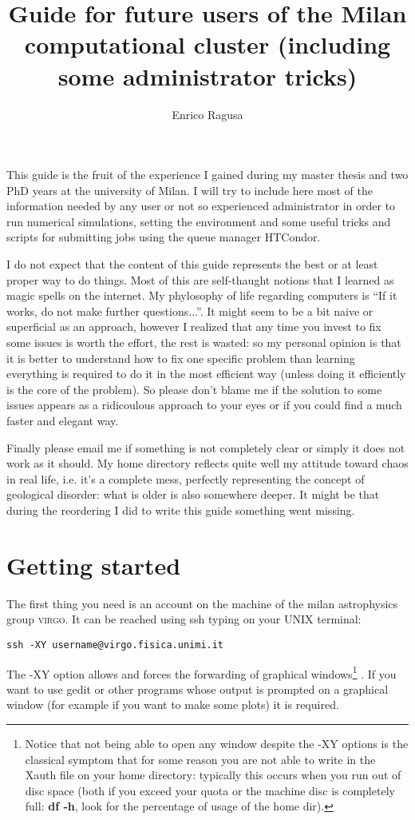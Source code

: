 \documentclass[10pt,a4paper,twoside]{article} %
\title{Guide for future users of the Milan computational cluster (including some administrator tricks)}
\author{Enrico Ragusa}
\begin{document}
\maketitle

This guide is the fruit of the experience I gained during my master thesis and two PhD years at the university of Milan. I will try to include here most of the information needed by any user or not so experienced administrator in order to run numerical simulations, setting the environment and some useful tricks and scripts for submitting jobs using the queue manager HTCondor. 

I do not expect that the content of this guide represents the best or at least proper way to do things. Most of this are self-thaught notions that I learned as magic spells on the internet. My phylosophy of life regarding computers is ``If it works, do not make further questions...''. It might seem to be a bit naive or superficial as an approach, however I realized that any time you invest to fix some issues is worth the effort, the rest is wasted: so my personal opinion is that it is better to understand how to fix one specific problem than learning everything is required to do it in the most efficient way (unless doing it efficiently is the core of the problem). So please don't blame me if the solution to some issues appears as a ridicoulous approach to your eyes or if you could find a much faster and elegant way.

Finally please email me if something is not completely clear or simply it does not work as it should. My home directory reflects quite well my attitude toward chaos in real life, i.e. it's a complete mess, perfectly representing the concept of geological disorder: what is older is also somewhere deeper. It might be that during the reordering I did to write this guide something went missing.  

\section{Getting started}

The first thing you need is an account on the machine of the milan astrophysics group \textsc{virgo}. It can be reached using ssh typing on your UNIX terminal:
\begin{verbatim}
ssh -XY username@virgo.fisica.unimi.it
\end{verbatim}
The -XY option allows and forces the forwarding of graphical windows\footnote{Notice that not being able to open any window despite the -XY options is the classical symptom that for some reason you are not able to write in the Xauth file on your home directory: typically this occurs when you run out of disc space (both if you exceed your quota or the machine disc is completely full: \textbf{df -h}, look for the percentage of usage of the home dir).} . If you want to use gedit or other programs whose output is prompted on a graphical window (for example if you want to make some plots) it is required. 
\end{document}
